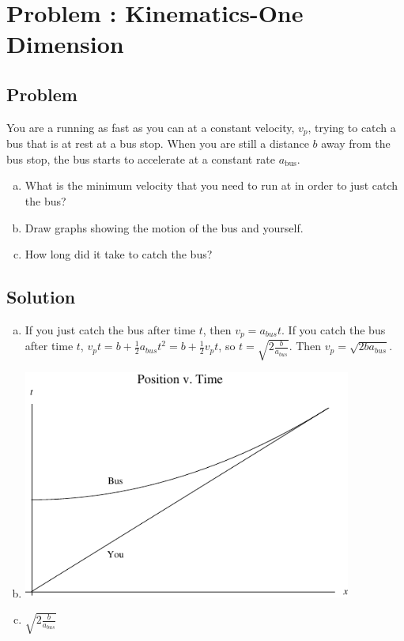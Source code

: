 \documentclass[solutions]{esg8012pset}
\begin{document}
\section{Problem \thesection: Kinematics-One Dimension}
\subsection{Problem}
  You are a running as fast as you can at a constant velocity, $v_p$, trying to catch a bus that is at rest
  at a bus stop. When you are still a distance $b$ away from the bus stop, the bus starts to accelerate
  at a constant rate $a_\text{bus}$.
  \begin{enumerate}[a)]
    \item What is the minimum velocity that you need to run at in order to just catch the bus?
    \item Draw graphs showing the motion of the bus and yourself.
    \item How long did it take to catch the bus?
  \end{enumerate}
\subsection{Solution}
  \begin{enumerate}[a)]
    \item If you just catch the bus after time $t$, then $v_p = a_{bus}t$.  If you catch the bus after time $t$, $v_p t = b + \frac{1}{2}a_{bus}t^2 = b + \frac{1}{2}v_p t$, so $t = \sqrt{2\frac{b}{a_{bus}}}$.  Then $v_p = \sqrt{2 b a_{bus}}$.
    \item \includegraphics[width=0.85\textwidth]{ps01_Plot_4}
    \item $\sqrt{2\frac{b}{a_{bus}}}$
  \end{enumerate}
\end{document}
